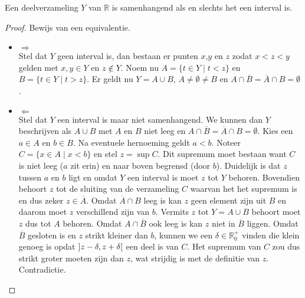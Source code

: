 \documentclass[main.tex]{subfiles}
\begin{document}
\begin{bpr}
  \label{pr:samenhangend-asa-interval}
  Een deelverzameling $Y$ van $\mathbb{R}$ is samenhangend als en slechts het een interval is.

  \begin{proof}
    Bewijs van een equivalentie.
    \begin{itemize}
    \item $\Rightarrow$\\
      Stel dat $Y$ geen interval is, dan bestaan er punten $x$,$y$ en $z$ zodat $x < z < y$ gelden met $x,y \in Y$ en $z \not\in Y$.
      Noem nu $A = \{ t \in Y \mid t < z \}$ en $B = \{ t \in Y \mid t > z \}$.
      Er geldt nu $Y = A \cup B$, $A \neq \emptyset \neq B$ en $A \cap \overline{B} = \overline{A} \cap B = \emptyset$.
    \item $\Leftarrow$\\
      Stel dat $Y$ een interval is maar niet samenhangend.
      We kunnen dan $Y$ beschrijven als $A \cup B$ met $A$ en $B$ niet leeg en $A \cap \overline{B} = \overline{A} \cap B = \emptyset$.
      Kies een $a\in A$ en $b\in B$.
      Na eventuele hernoeming geldt $a < b$.
      Noteer $C = \{ x \in A \mid x < b \}$ en stel $z=\sup C$.
      Dit supremum moet bestaan want $C$ is niet leeg ($a$ zit erin) en naar boven begrensd (door $b$).
      Duidelijk is dat $z$ tussen $a$ en $b$ ligt en omdat $Y$ een interval is moet $z$ tot $Y$ behoren.
      Bovendien behoort $z$ tot de sluiting van de verzameling $C$ waarvan het het supremum is en dus zeker $z\in \overline{A}$.
      Omdat $\overline{A} \cap B$ leeg is kan $z$ geen element zijn uit $B$ en daarom moet $z$ verschillend zijn van $b$.
      Vermits $z$ tot $Y = A \cup B$ behoort moet $z$ dus tot $A$ behoren.
      Omdat $A \cap \overline{B}$ ook leeg is kan $z$ niet in $\overline{B}$ liggen.
      Omdat $\overline{B}$ gesloten is en $z$ strikt kleiner dan $b$, kunnen we een $\delta \in \mathbb{R}_{0}^{+}$ vinden die klein genoeg is opdat $\interval[open]{z-\delta}{z+\delta}$ een deel is van $C$.
      Het supremum van $C$ zou dus strikt groter moeten zijn dan $z$, wat strijdig is met de definitie van $z$.
      Contradictie.
    \end{itemize}
  \end{proof}
\end{bpr}
\end{document}
